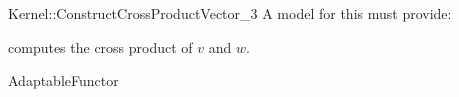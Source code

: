 \begin{ccRefFunctionObjectConcept}{Kernel::ConstructCrossProductVector_3}
A model for this must provide:



            {computes the cross product of $v$ and $w$.}

\ccRefines
AdaptableFunctor

\ccSeeAlso

\\

\end{ccRefFunctionObjectConcept}

